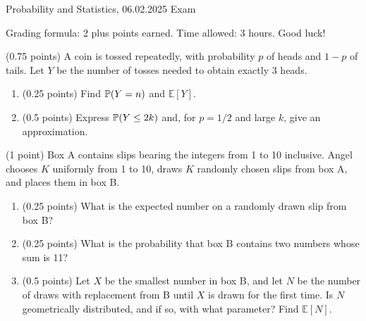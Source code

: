 \documentclass[a4paper]{report}
\begin{document}
\noindent Probability and Statistics, 06.02.2025 \hfill Exam

\hrulefill

\begin{it}
\noindent Grading formula: $2$ plus points earned.
Time allowed: 3 hours. Good luck!
\end{it}

\vspace{2ex}



\begin{problem} (0.75 points)
A coin is tossed repeatedly, with probability $p$ of heads and $1-p$ of tails.
Let $Y$ be the number of tosses needed to obtain exactly 3 heads.
\begin{enumerate}
    \item (0.25 points) Find $\P(Y=n)$ and $\mathbb E[Y]$.
    \item (0.5 points) Express $\P(Y\leq2k)$ and,
    for $p=1/2$ and large $k$, give an approximation.
\end{enumerate}
\end{problem}




\begin{problem} (1 point)
Box A contains slips bearing the integers from 1 to 10 inclusive.
Angel chooses $K$ uniformly from 1 to 10, draws $K$ randomly chosen slips from box A, and places them in box B.

\begin{enumerate}
    \item (0.25 points) What is the expected number on a randomly drawn slip from box B?
    \item (0.25 points) What is the probability that box B contains two numbers whose sum is 11?
    \item (0.5 points) Let $X$ be the smallest number in box B, and let $N$ be the number of draws with replacement from B until $X$ is drawn for the first time. Is $N$ geometrically distributed, and if so, with what parameter? Find $\mathbb E[N]$.
\end{enumerate}
\end{problem}
\end{document}
